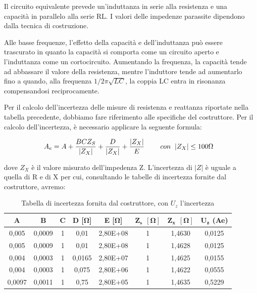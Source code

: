 Il circuito equivalente prevede un'induttanza in serie alla resistenza e una capacità in parallelo alla serie RL. I valori delle impedenze parassite dipendono dalla tecnica di costruzione.

Alle basse frequenze, l'effetto della capacità e dell'induttanza può essere trascurato in quanto la capacità si comporta come un circuito aperto e l'induttanza come un cortocircuito. Aumentando la frequenza, la capacità tende ad abbassare il valore della resistenza, mentre l'induttore tende ad aumentarlo fino a quando, alla frequenza $1/2\pi\sqrt{LC}$, la coppia LC entra in risonanza compensandosi reciprocamente.

Per il calcolo dell'incertezza delle misure di resistenza e reattanza riportate nella tabella precedente, dobbiamo fare riferimento alle specifiche del costruttore. Per il calcolo dell'incertezza, è necessario applicare la seguente formula:

\begin{equation}
    A_e = A + \frac{BCZ_S}{|Z_X|} + \frac{D}{|Z_X|} + \frac{|Z_X|}{E} \hspace{0,8cm} con \hspace{0,2cm} |Z_X| \leq 100\Omega
\end{equation}

dove $Z_X$ è il valore misurato dell’impedenza Z. L’incertezza di $|Z|$ è uguale a quella di 
R e di X per cui, consultando le tabelle di incertezza fornite dal costruttore, avremo:


\begin{table}[!ht]
\centering
\begin{tabular}{|c|c|c|c|c|c|c|c|}
\hline
\textbf{A}      & \textbf{B}      & \textbf{C} & \textbf{D [$\bm{\Omega}$]} & \textbf{E [$\bm{\Omega}$]}  & $\bm{Z_s \ \ [\Omega]}$ & $\bm{Z_x \ \ [\Omega]}$ & $\bm{U_z}$ \textbf{(Ae)} \\ \hline
0,005  & 0,0009 & 1 & 0,01      & 2,80E+08  & 1          & 1,4630     & 0,0125  \\ \hline
0,005  & 0,0009 & 1 & 0,01      & 2,80E+08  & 1          & 1,4628     & 0,0125  \\ \hline
0,004  & 0,0003 & 1 & 0,0165    & 2,80E+07  & 1          & 1,4625     & 0,0155  \\ \hline
0,004  & 0,0003 & 1 & 0,075     & 2,80E+06  & 1          & 1,4622     & 0,0555  \\ \hline
0,0097 & 0,0011 & 1 & 0,75      & 2,80E+05  & 1          & 1,4635     & 0,5229  \\ \hline
\end{tabular}
\caption{Tabella di incertezza fornita dal costruttore, con $U_z$ l'incertezza}
\label{tab:lcr_z_sheet}
\end{table}
\FloatBarrier


